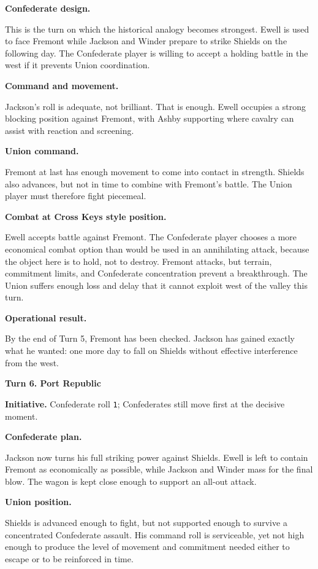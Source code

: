 \documentclass[11pt]{article}
\begin{document}
\textbf{Confederate design.}

This is the turn on which the historical analogy becomes strongest. Ewell is used to face Fremont while Jackson and Winder prepare to strike Shields on the following day. The Confederate player is willing to accept a holding battle in the west if it prevents Union coordination.

\textbf{Command and movement.}

Jackson's roll is adequate, not brilliant. That is enough. Ewell occupies a strong blocking position against Fremont, with Ashby supporting where cavalry can assist with reaction and screening.

\textbf{Union command.}

Fremont at last has enough movement to come into contact in strength. Shields also advances, but not in time to combine with Fremont's battle. The Union player must therefore fight piecemeal.

\textbf{Combat at Cross Keys style position.}

Ewell accepts battle against Fremont. The Confederate player chooses a more economical combat option than would be used in an annihilating attack, because the object here is to hold, not to destroy. Fremont attacks, but terrain, commitment limits, and Confederate concentration prevent a breakthrough. The Union suffers enough loss and delay that it cannot exploit west of the valley this turn.

\textbf{Operational result.}

By the end of Turn 5, Fremont has been checked. Jackson has gained exactly what he wanted: one more day to fall on Shields without effective interference from the west.

\textbf{Turn 6. Port Republic}

\textbf{Initiative.} Confederate roll \texttt{1}; Confederates still move first at the decisive moment.

\textbf{Confederate plan.}

Jackson now turns his full striking power against Shields. Ewell is left to contain Fremont as economically as possible, while Jackson and Winder mass for the final blow. The wagon is kept close enough to support an all-out attack.

\textbf{Union position.}

Shields is advanced enough to fight, but not supported enough to survive a concentrated Confederate assault. His command roll is serviceable, yet not high enough to produce the level of movement and commitment needed either to escape or to be reinforced in time.
\end{document}
